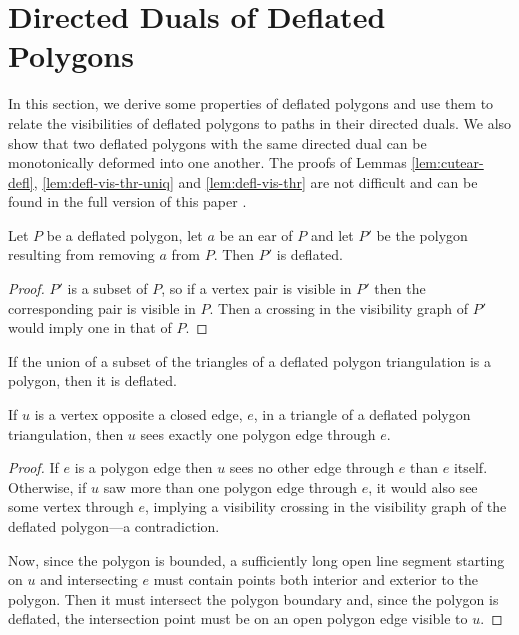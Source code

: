 \documentclass{amsart}
\begin{document}

\section{Directed Duals of Deflated Polygons}

In this section, we derive some properties of deflated polygons and
use them to relate the visibilities of deflated polygons to paths in
their directed duals.  We also show that two deflated polygons with
the same directed dual can be monotonically deformed into one another.
\ifconferenceversion The proofs of Lemmas \ref{lem:cutear-defl},
\ref{lem:defl-vis-thr-uniq} and \ref{lem:defl-vis-thr} are not
difficult and can be found in the full version of this
paper \cite{Bose12}. \fi

\begin{lemma}
  \label{lem:cutear-defl}
  Let $P$ be a deflated polygon, let $a$ be an ear of $P$ and let $P'$
  be the polygon resulting from removing $a$ from $P$.  Then $P'$ is
  deflated.
\end{lemma}
\iffullversion
\begin{proof}
  $P'$ is a subset of $P$, so if a vertex pair is visible in $P'$ then
  the corresponding pair is visible in $P$.  Then a crossing in the
  visibility graph of $P'$ would imply one in that of $P$.
\end{proof}
\fi

\begin{cor}
  \label{cor:subpoly-defl}
  If the union of a subset of the triangles of a deflated polygon
  triangulation is a polygon, then it is deflated.
\end{cor}

\begin{lemma}
  \label{lem:defl-vis-thr-uniq}
  If $u$ is a vertex opposite a closed edge, $e$, in a triangle of a
  deflated polygon triangulation, then $u$ sees exactly one polygon
  edge through $e$.
\end{lemma}
\iffullversion
\begin{proof}
  If $e$ is a polygon edge then $u$ sees no other edge through $e$
  than $e$ itself.  Otherwise, if $u$ saw more than one polygon edge
  through $e$, it would also see some vertex through $e$, implying a
  visibility crossing in the visibility graph of the deflated
  polygon---a contradiction.
  
  Now, since the polygon is bounded, a sufficiently long open line
  segment starting on $u$ and intersecting $e$ must contain points
  both interior and exterior to the polygon.  Then it must intersect
  the polygon boundary and, since the polygon is deflated, the
  intersection point must be on an open polygon edge visible to $u$.
\end{proof}
\fi
\end{document}
